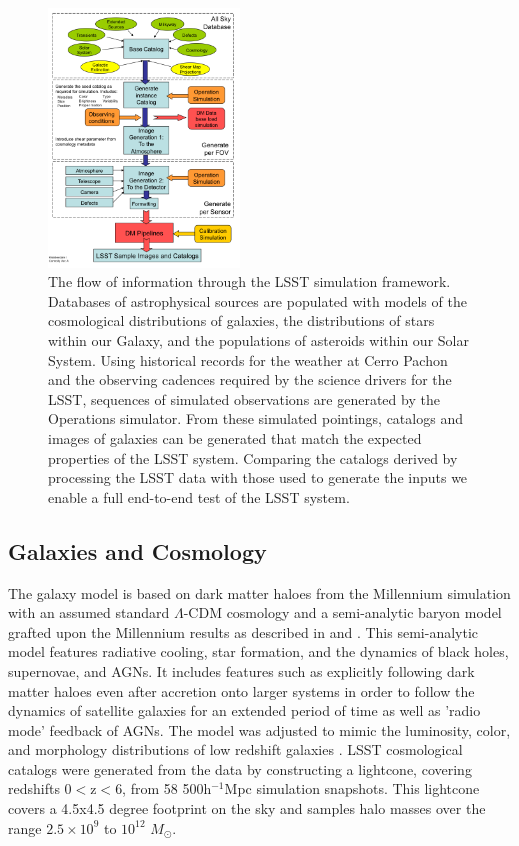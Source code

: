 \documentclass[]{article}
\begin{document}
{\begin{figure}[H]
\centerline{\includegraphics[width=2in]{validation_figures/flow.png}}
%
%
\caption{The flow of information through the LSST simulation
  framework. Databases of astrophysical sources are populated with
  models of the cosmological distributions of galaxies, the
  distributions of stars within our Galaxy, and the populations of
  asteroids within our Solar System. Using historical records for the
  weather at Cerro Pachon and the observing cadences required by the
  science drivers for the LSST, sequences of simulated observations
  are generated by the Operations simulator. From these simulated
  pointings, catalogs and images of galaxies can be generated that
  match the expected properties of the LSST system. Comparing the
  catalogs derived by processing the LSST data with those used to
  generate the inputs we enable a full end-to-end test of the LSST
  system.}
\label{fig:flow}       %
\end{figure}


\subsection{Galaxies and Cosmology \label{sec:gal}}

The galaxy model is based on dark matter haloes from the Millennium
simulation \citep{springel05} with an assumed standard $\Lambda$-CDM
cosmology and a semi-analytic baryon model grafted upon the Millennium
results as described in \citet{springel05} and \citet{delucia}. This
semi-analytic model features radiative cooling, star formation, and
the dynamics of black holes, supernovae, and AGNs. It includes
features such as explicitly following dark matter haloes even
after accretion onto larger systems in order to follow the dynamics of
satellite galaxies for an extended period of time as well as 'radio
mode' feedback of AGNs. The model was adjusted to mimic the
luminosity, color, and morphology distributions of low redshift
galaxies \citep{delucia}. LSST cosmological catalogs were generated
from the \citet{delucia} data
by constructing a lightcone, covering redshifts 0$<$z$<$6, from 58
500h$^{-1}$Mpc simulation snapshots. This lightcone covers a 4.5x4.5
degree footprint on the sky and samples halo masses over the range
$2.5\times10^9$ to $10^{12}$ $M_\odot$. 

}
\end{document}
